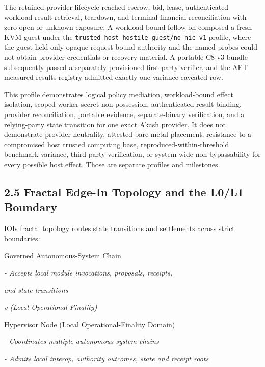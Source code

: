 \documentclass[
  11pt,
]{article}
\begin{document}
The retained provider lifecycle reached escrow, bid, lease, authenticated
workload-result retrieval, teardown, and terminal financial reconciliation with
zero open or unknown exposure. A workload-bound follow-on composed a fresh
KVM guest under the
\texttt{trusted\_host\_}\allowbreak\texttt{hostile\_guest/no-nic-v1} profile,
where the guest held only opaque request-bound authority and the named probes
could not obtain provider credentials or recovery material. A portable C8 v3
bundle subsequently passed a separately provisioned first-party verifier, and
the AFT measured-results registry admitted exactly one variance-caveated row.

This profile demonstrates logical policy mediation, workload-bound effect
isolation, scoped worker secret non-possession, authenticated result binding,
provider reconciliation, portable evidence, separate-binary verification, and
a relying-party state transition for one exact Akash provider. It does not
demonstrate provider neutrality, attested bare-metal placement, resistance to a
compromised host trusted computing base, reproduced-within-threshold benchmark
variance, third-party verification, or system-wide non-bypassability for every
possible host effect. Those are separate profiles and milestones.

\hypertarget{fractal-edge-in-topology-and-the-l0l1-boundary}{%
\subsection{2.5 Fractal Edge-In Topology and the L0/L1
Boundary}\label{fractal-edge-in-topology-and-the-l0l1-boundary}}

IOI\textquotesingle s fractal topology routes state transitions and
settlements across strict boundaries:

Governed Autonomous-System Chain

\emph{- Accepts local module invocations, proposals, receipts,}

\emph{and state transitions}

\emph{\textbar{}}

\emph{v (Local Operational Finality)}

Hypervisor Node (Local Operational-Finality Domain)

\emph{- Coordinates multiple autonomous-system chains}

\emph{- Admits local interop, authority outcomes, state and receipt roots}

\emph{\textbar{}}
\end{document}

